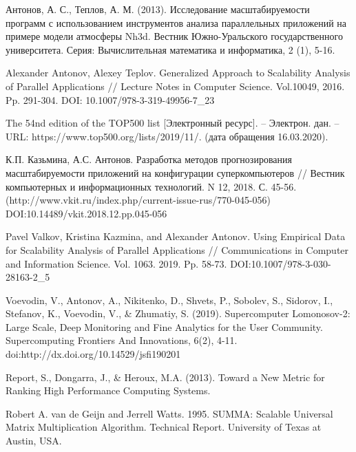 \begin{thebibliography}{00}
	Антонов, А. С., Теплов, А. М. (2013). Исследование масштабируемости программ с использованием инструментов анализа параллельных приложений на примере модели атмосферы Nh3d. Вестник Южно-Уральского государственного университета. Серия: Вычислительная математика и информатика, 2 (1), 5-16.

	Alexander Antonov, Alexey Teplov. Generalized Approach to Scalability Analysis of Parallel Applications // Lecture Notes in Computer Science. Vol.10049, 2016. Pp. 291-304. DOI: 10.1007/978-3-319-49956-7\_23

  	The 54nd edition of the TOP500 list [Электронный ресурс]. – Электрон. дан. – URL: https://www.top500.org/lists/2019/11/. (дата обращения 16.03.2020).

	К.П. Казьмина, А.С. Антонов. Разработка методов прогнозирования масштабируемости приложений на конфигурации суперкомпьютеров // Вестник компьютерных и информационных технологий. N 12, 2018. С. 45-56.(http://www.vkit.ru/index.php/current-issue-rus/770-045-056) DOI:10.14489/vkit.2018.12.pp.045-056

    Pavel Valkov, Kristina Kazmina, and Alexander Antonov. Using Empirical Data for Scalability Analysis of Parallel Applications // Communications in Computer and Information Science. Vol. 1063. 2019. Pp. 58-73. DOI:10.1007/978-3-030-28163-2\_5

	Voevodin, V., Antonov, A., Nikitenko, D., Shvets, P., Sobolev, S., Sidorov, I., Stefanov, K., Voevodin, V., \& Zhumatiy, S. (2019). Supercomputer Lomonosov-2: Large Scale, Deep Monitoring and Fine Analytics for the User Community. Supercomputing Frontiers And Innovations, 6(2), 4-11. doi:http://dx.doi.org/10.14529/jsfi190201

	Report, S., Dongarra, J., \& Heroux, M.A. (2013). Toward a New Metric for Ranking High Performance Computing Systems.
	
	Robert A. van de Geijn and Jerrell Watts. 1995. SUMMA: Scalable Universal Matrix Multiplication Algorithm. Technical Report. University of Texas at Austin, USA.




\end{thebibliography}
\clearpage